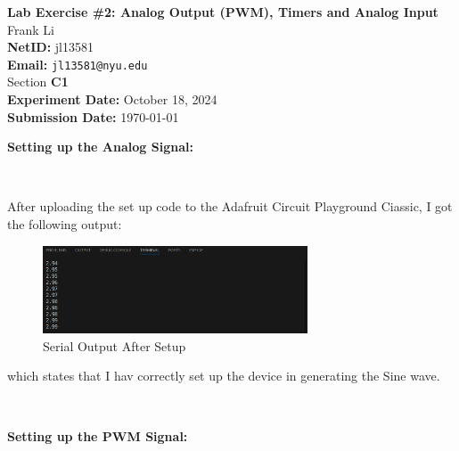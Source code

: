 \documentclass{report}
\begin{document}
\begin{titlepage}
\vspace*{\fill}
\begin{center}
    \textbf{\huge Lab Exercise \#2: Analog Output (PWM), Timers and Analog Input} \\[1em]
    Frank Li \\
    \textbf{NetID:} jl13581\\
    \textbf{Email:} \texttt{jl13581@nyu.edu}\\
    Section \textbf{C1} \\ [1em]
    \textbf{Experiment Date:} October 18, 2024\\
    \textbf{Submission Date:} \today
\end{center}
\vspace*{\fill}
\end{titlepage}
	\pagestyle{fancy}
	\fancyhf{}
	\fancyfoot[R]{\thepage}
    \begin{minipage}{\textwidth}
        \Large
        \textbf{Setting up the Analog Signal:}
    \end{minipage}\\[0.5em]
    \begin{minipage}{\textwidth}
        After uploading the set up code to the Adafruit Circuit Playground Ciassic, I got the following output:
    \end{minipage}
    \begin{figure}[H]
        \centering
        \includegraphics[width = 0.7\textwidth]{setup.png}
        \caption{Serial Output After Setup}
    \end{figure}
    \begin{minipage}{\textwidth}
        which states that I hav correctly set up the device in generating the Sine wave. 
    \end{minipage}\\[1em]
    \begin{minipage}{\textwidth}
        \Large
        \textbf{Setting up the PWM Signal:}
    \end{minipage}\\[0.5em]
\end{document}
